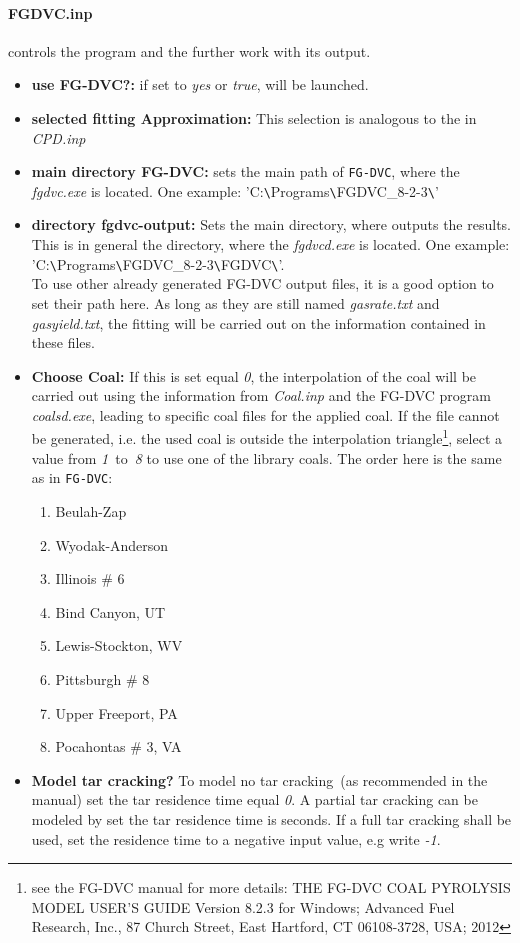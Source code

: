 \paragraph{FGDVC.inp} controls the \FGDVC program and the further work with its output.
\begin{itemize}
 \item \textbf{use FG-DVC?:}  if set to \emph{yes} or \emph{true}, \FGDVC will be launched.
 \item \textbf{selected fitting Approximation:} This selection is analogous to the in \textit{CPD.inp}
 \item \textbf{main directory FG-DVC:} sets the main path of \texttt{FG-DVC}, where the \emph{fgdvc.exe} is located. One example: '{C:\verb|\|Programs\verb|\|FGDVC\_8-2-3\verb|\|}'
 \item \textbf{directory fgdvc-output:} Sets the main directory, where \FGDVC outputs the results. This is in general the directory, where the \emph{fgdvcd.exe} is located. One example: '{C:\verb|\|Programs\verb|\|FGDVC\_8-2-3\verb|\|FGDVC\verb|\|}'.\\To use other already generated FG-DVC output files, it is a good option to set their path here. As long as they are still named \emph{gasrate.txt} and \emph{gasyield.txt}, the fitting will be carried out on the information contained in these files.
 \item \textbf{Choose Coal:} If this is set equal \emph{0}, the interpolation of the coal will be carried out using the information from \emph{Coal.inp} and the FG-DVC program \emph{coalsd.exe}, leading to specific \FGDVC coal files for the applied coal. If the file cannot be generated, i.e. the used coal is outside the interpolation triangle\footnote{see the FG-DVC manual for more details: THE FG-DVC COAL PYROLYSIS MODEL USER'S GUIDE Version 8.2.3 for Windows; Advanced Fuel Research, Inc., 87 Church Street, East Hartford, CT 06108-3728, USA; 2012}, select a value from \emph{1}~to~\emph{8} to use one of the \FGDVC library coals. The order here is the same as in \texttt{FG-DVC}:
 \begin{enumerate}
  \item Beulah-Zap
  \item Wyodak-Anderson
  \item Illinois \# 6
  \item Bind Canyon, UT
  \item Lewis-Stockton, WV
  \item Pittsburgh \# 8
  \item Upper Freeport, PA
  \item Pocahontas \# 3, VA
 \end{enumerate}
 \item \textbf{Model tar cracking?} To model no tar cracking~(as recommended in the \FGDVC manual) set the tar residence time equal \emph{0}. A partial tar cracking can be modeled by set the tar residence time is seconds. If a full tar cracking shall be used, set the residence time to a negative input value, e.g write \emph{-1}.           
\end{itemize}

